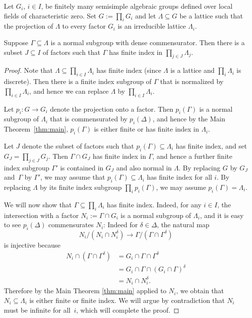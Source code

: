 \begin{thm}\label{thm:reducible}
Let $G_i$, $i\in I$, be finitely many semisimple algebraic groups defined over local fields of characteristic zero. Set $G:=\prod_i G_i$ and let $\Lambda\subseteq G$ be a lattice such that the projection of $\Lambda$ to every factor $G_i$ is an irreducible lattice $\Lambda_i$.

Suppose $\Gamma\subseteq \Lambda$ is a normal subgroup with dense commensurator. Then there is a subset $J\subseteq I$ of factors such that $\Gamma$ has finite index in $\prod_{j\in J} \Lambda_j$.
\end{thm}
\begin{proof} Note that $\Lambda\subseteq \prod_{i\in I} \Lambda_i$ has finite index (since $\Lambda$ is a lattice and $\prod_i \Lambda_i$ is discrete). Then there is a finite index subgroup of $\Gamma$ that is normalized by $\prod_{i\in I} \Lambda_i$, and hence we can replace $\Lambda$ by $\prod_{i\in I} \Lambda_i$.

Let $p_i:G\to G_i$ denote the projection onto a factor. Then $p_i(\Gamma)$ is a normal subgroup of $\Lambda_i$ that is commensurated by $p_i(\Delta)$, and hence by the Main Theorem~\ref{thm:main}, $p_i(\Gamma)$ is either finite or has finite index in $\Lambda_i$.

Let $J$ denote the subset of factors such that $p_i(\Gamma)\subseteq\Lambda_i$ has finite index, and set $G_J=\prod_{j\in J} G_j$. Then $\Gamma\cap G_J$ has finite index in $\Gamma$, and hence a further finite index subgroup $\Gamma'$ is contained in $G_J$ and also normal in $\Lambda$. By replacing $G$ by $G_J$ and~$\Gamma$ by $\Gamma'$, we may assume that $p_i(\Gamma)\subseteq \Lambda_i$ has finite index for all $i$. By replacing $\Lambda$ by its finite index subgroup $\prod_i p_i(\Gamma)$, we may assume $p_i(\Gamma)=\Lambda_i$.

We will now show that $\Gamma\subseteq \prod_i \Lambda_i$ has finite index. Indeed, for any $i\in I$, the intersection with a factor $N_i:=\Gamma\cap G_i$ is a normal subgroup of $\Lambda_i$, and it is easy to see $p_i(\Delta)$ commensurates $N_i$: Indeed for $\delta\in\Delta$, the natural map
\[
N_i/(N_i\cap N_i^\delta) \to \Gamma / (\Gamma\cap\Gamma^\delta)
\]
is injective because
\begin{align*}
N_i\cap (\Gamma \cap \Gamma^\delta) &= G_i \cap \Gamma\cap \Gamma^\delta \\
&= G_i\cap \Gamma \cap (G_i\cap \Gamma)^\delta \\
&= N_i\cap N_i^\delta.
\end{align*}
Therefore by the Main Theorem \ref{thm:main} applied to $N_i$, we obtain that $N_i\subseteq \Lambda_i$ is either finite or finite index. We will argue by contradiction that $N_i$ must be infinite for all~$i$, which will complete the proof.


\end{proof}
